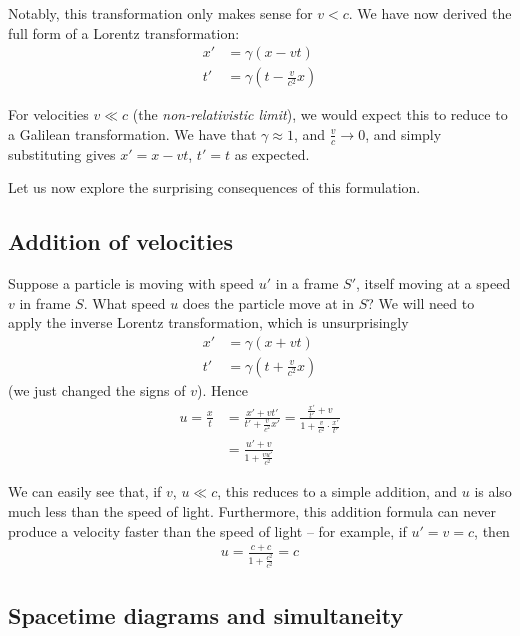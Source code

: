 \documentclass{../template/note}
\begin{document}
    Notably, this transformation only makes sense for \(v < c\). We have now derived the full form of a Lorentz transformation:
    \begin{align*}
        x' &= \gamma(x-vt) \\
        t' &= \gamma\left(t-\frac v{c^2} x\right)
    \end{align*}
    
    For velocities \(v \ll c\) (the \emph{non-relativistic limit}), we would expect this to reduce to a Galilean transformation. We have that \(\gamma \approx 1\), and \(\frac v c \to 0\), and simply substituting gives \(x' = x-vt\), \(t' = t\) as expected.

    Let us now explore the surprising consequences of this formulation.
    
    \subsection{Addition of velocities}
    
    Suppose a particle is moving with speed \(u'\) in a frame \(S'\), itself moving at a speed \(v\) in frame \(S\). What speed \(u\) does the particle move at in \(S\)? We will need to apply the inverse Lorentz transformation, which is unsurprisingly
    \begin{align*}
        x' &= \gamma(x+vt) \\
        t' &= \gamma\left(t+\frac v{c^2} x\right)
    \end{align*}
    (we just changed the signs of \(v\)). Hence
    \begin{align*}
        u = \frac x t &= \frac{x'+vt'}{t'+ \frac v{c^2}x'} = \frac{\frac{x'}{t'}+v}{1 + \frac{v}{c^2} \cdot \frac{x'}{t'}} \\
        &= \frac{u' + v}{1 + \frac{vu'}{c^2}}
    \end{align*}
    
    We can easily see that, if \(v\), \(u \ll c\), this reduces to a simple addition, and \(u\) is also much less than the speed of light. Furthermore, this addition formula can never produce a velocity faster than the speed of light -- for example, if \(u' = v = c\), then
    \begin{align*}
        u = \frac{c + c}{1 + \frac{c^2}{c^2}} = c
    \end{align*}
    
    \subsection{Spacetime diagrams and simultaneity}
\end{document}

